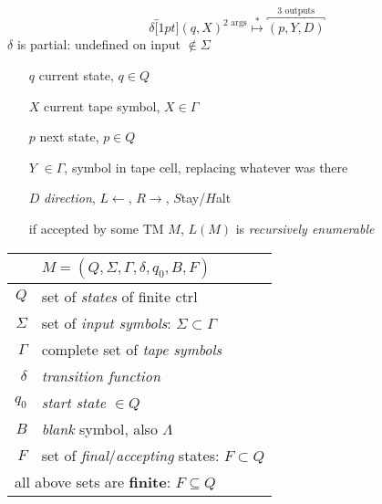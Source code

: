 {\footnotesize
\begin{minipage}[]{0.5\linewidth}
\setlength{\abovedisplayskip}{0pt}
\setlength{\belowdisplayskip}{0pt}
  \[\delta\overbracket[1pt]{(q,X)}^\text{2 args} \overset{*}{\mapsto} \overbracket{(p,Y,D)}^\text{3 outputs} \]
  $\delta$ is partial: undefined on input \(\notin \Sigma\)
\begin{enumerate}[leftmargin=*,labelindent=0pt]
    \item[$q$] current state, \(q \in Q\)
    \item[$X$] current tape symbol, \(X \in \Gamma\)
    \item[$p$] next state, \(p \in Q\)
    \item[$Y$] \(\in \Gamma\), symbol in tape cell, replacing whatever was there
    \item[$D$] \emph{direction}, \(L\leftarrow\), \(R\rightarrow\), \(S\)tay/\(H\)alt
    \item[] if accepted by some TM \(M\), \(L(M)\) is \emph{recursively enumerable}
    \end{enumerate}

\end{minipage}
\begin{minipage}{0.5\linewidth}
  \centering
  \begin{tabular}{r|p{3.8cm}}
    & $ M = (Q,\Sigma,\Gamma,\delta,q_{0},B,F)$  \\
    \hline
    $Q$ & set of \emph{states} of finite ctrl\\
    $\Sigma$ & set of \emph{input symbols}: \(\Sigma \subset \Gamma\)\\
    $\Gamma$ & complete set of \emph{tape symbols}\\
    $\delta$ & \emph{transition function}\\
    $q_{0}$  &  \emph{start state} \(\in Q\)\\
    $B$     & \emph{blank} symbol, also \(\Lambda\)\\
    $F$      & set of \emph{final}/\emph{accepting} states: \(F \subset Q\)\\
    \hline
    \multicolumn{2}{l}{all above sets are \textbf{finite}: \(F \subseteq Q\) }\\
    \hline
\end{tabular}\\
\end{minipage}
 }
